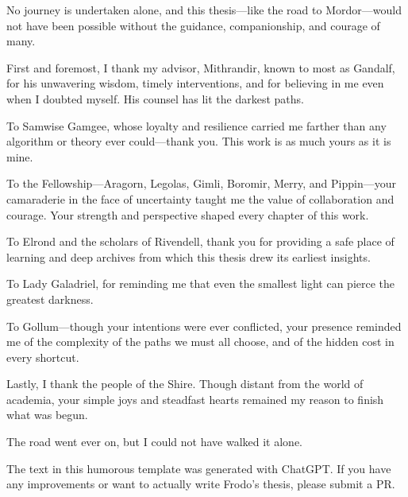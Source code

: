 \documentclass[main.tex]{subfiles}
\begin{document}
No journey is undertaken alone, and this thesis—like the road to Mordor—would not have been possible without the guidance, companionship, and courage of many.

First and foremost, I thank my advisor, Mithrandir, known to most as Gandalf, for his unwavering wisdom, timely interventions, and for believing in me even when I doubted myself. His counsel has lit the darkest paths.

To Samwise Gamgee, whose loyalty and resilience carried me farther than any algorithm or theory ever could—thank you. This work is as much yours as it is mine.

To the Fellowship—Aragorn, Legolas, Gimli, Boromir, Merry, and Pippin—your camaraderie in the face of uncertainty taught me the value of collaboration and courage. Your strength and perspective shaped every chapter of this work.

To Elrond and the scholars of Rivendell, thank you for providing a safe place of learning and deep archives from which this thesis drew its earliest insights.

To Lady Galadriel, for reminding me that even the smallest light can pierce the greatest darkness.

To Gollum—though your intentions were ever conflicted, your presence reminded me of the complexity of the paths we must all choose, and of the hidden cost in every shortcut.

Lastly, I thank the people of the Shire. Though distant from the world of academia, your simple joys and steadfast hearts remained my reason to finish what was begun.

The road went ever on, but I could not have walked it alone.

The text in this humorous template was generated with ChatGPT\@. If you have any improvements or want to actually write Frodo's thesis, please submit a PR\@.
\end{document}
